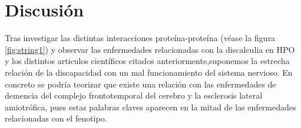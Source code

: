 \section{Discusión}

Tras investigar las distintas interacciones proteína-proteína (véase la figura \ref{fig:string1}) y observar las enfermedades relacionadas con la discalculia en HPO y los distintos articulos científicos citados anteriormente,suponemos la estrecha relación de la discapacidad con un mal funcionamiento del sistema nervioso. En concreto se podría teorizar que existe una relación con las enfermedades de demencia del complejo frontotemporal del cerebro y la esclerosis lateral amiotrófica, pues estas palabras claves aparecen en la mitad de las enfermedades relacionadas con el fenotipo.

\newpage